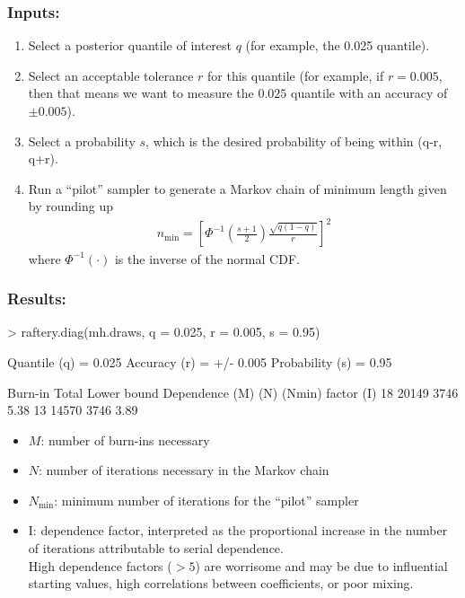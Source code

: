 \documentclass[handout]{beamer}
\begin{document}
\begin{frame}
\frametitle{Inputs:}
\pause
\begin{enumerate}
\item Select a posterior quantile of interest $q$ (for example, the
0.025 quantile).
\pause
\item Select an acceptable tolerance $r$ for this quantile \pause (for
example, if $r = 0.005$, then that means we want to measure the
$0.025$ quantile with an accuracy of $\pm 0.005$).
\pause
\item Select a probability $s$, which is the desired probability of
being within (q-r, q+r).
\pause
\item Run a ``pilot'' sampler to generate a Markov chain of minimum
length given by rounding up
\begin{eqnarray*}
n_{\mathrm{min}} = \left[ \Phi^{-1} \left( \frac{s+1}{2} \right)
\frac{\sqrt{q(1-q)}}{r} \right] ^2
\end{eqnarray*}
where $\Phi^{-1} (\cdot)$ is the inverse of the normal CDF.
\end{enumerate}
\end{frame}

\begin{frame}[fragile]
\frametitle{Results:}
\pause
\tiny
\begin{Schunk}
\begin{Sinput}
> raftery.diag(mh.draws, q = 0.025, r = 0.005, s = 0.95)
\end{Sinput}
\begin{Soutput}
Quantile (q) = 0.025
Accuracy (r) = +/- 0.005
Probability (s) = 0.95 
                                       
 Burn-in  Total Lower bound  Dependence
 (M)      (N)   (Nmin)       factor (I)
 18       20149 3746         5.38      
 13       14570 3746         3.89      
\end{Soutput}
\end{Schunk}
\normalsize
\pause
\begin{itemize}
\item $M$: number of burn-ins necessary
\pause
\item $N$: number of iterations necessary in the Markov chain
\pause
\item $N_{\mathrm{min}}$: minimum number of iterations for
the ``pilot'' sampler
\pause
\item I: dependence factor, interpreted as the proportional increase
in the number of iterations attributable to serial dependence.  \\
\pause
\bigskip
High dependence factors ($> 5$) are worrisome and may be due to
influential starting values, high correlations between coefficients,
or poor mixing.
\end{itemize}
\end{frame}
\end{document}
